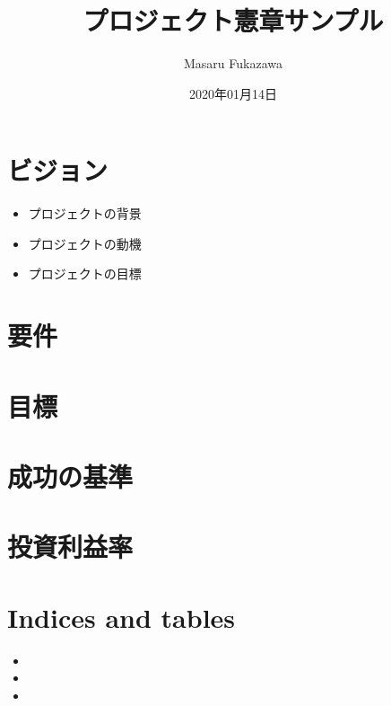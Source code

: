 \documentclass[letterpaper,10pt,dvipdfmx]{sphinxmanual}
\title{プロジェクト憲章サンプル}
\date{2020年01月14日}
\author{Masaru Fukazawa}
\begin{document}
\pagestyle{empty}
\sphinxmaketitle
\pagestyle{plain}
\sphinxtableofcontents
\pagestyle{normal}
\label{\detokenize{index::doc}}



\chapter{ビジョン}
\label{\detokenize{index:id2}}\begin{itemize}
\item {} 
プロジェクトの背景

\item {} 
プロジェクトの動機

\item {} 
プロジェクトの目標

\end{itemize}


\chapter{要件}
\label{\detokenize{index:id3}}

\chapter{目標}
\label{\detokenize{index:id4}}

\chapter{成功の基準}
\label{\detokenize{index:id5}}

\chapter{投資利益率}
\label{\detokenize{index:id6}}

\chapter{Indices and tables}
\label{\detokenize{index:indices-and-tables}}\begin{itemize}
\item {} 

\item {} 

\item {} 

\end{itemize}



\renewcommand{\indexname}{索引}
\printindex
\end{document}
